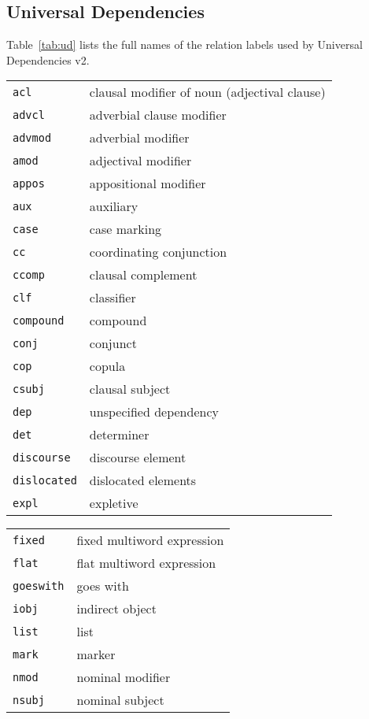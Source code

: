 \documentclass[11pt,a4paper]{article}
\begin{document}
\subsection{Universal Dependencies}

Table~\ref{tab:ud} lists the full names of the
relation labels used by Universal Dependencies v2.

\begin{table}[h]
\centering
\footnotesize
\begin{tabular}{ll|}
\texttt{acl} & clausal modifier of noun (adjectival clause) \\
\texttt{advcl} & adverbial clause modifier \\
\texttt{advmod} & adverbial modifier \\
\texttt{amod} & adjectival modifier \\
\texttt{appos} & appositional modifier \\
\texttt{aux} & auxiliary \\
\texttt{case} & case marking \\
\texttt{cc} & coordinating conjunction \\
\texttt{ccomp} & clausal complement \\
\texttt{clf} & classifier \\
\texttt{compound} & compound \\
\texttt{conj} & conjunct \\
\texttt{cop} & copula \\
\texttt{csubj} & clausal subject \\
\texttt{dep} & unspecified dependency \\
\texttt{det} & determiner \\
\texttt{discourse} & discourse element \\
\texttt{dislocated} & dislocated elements \\
\texttt{expl} & expletive
\end{tabular}
\begin{tabular}{ll}
\texttt{fixed} & fixed multiword expression \\
\texttt{flat} & flat multiword expression \\
\texttt{goeswith} & goes with \\
\texttt{iobj} & indirect object \\
\texttt{list} & list \\
\texttt{mark} & marker \\
\texttt{nmod} & nominal modifier \\
\texttt{nsubj} & nominal subject \\

\end{tabular}
\end{table}
\end{document}
